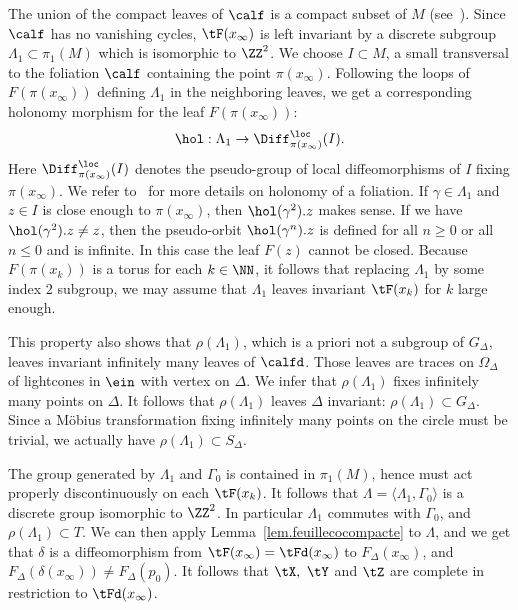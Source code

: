 The union of the compact leaves of $\calf$ is a compact subset of $M$ (see~\cite[Chapter~II, Corollary~3.10]{godbillon}). Since $\calf$ has no vanishing cycles, $\tF(x_{\infty})$ is left invariant by a discrete subgroup $\Lambda_1 \subset \pi_1(M)$ which is isomorphic to $\ZZ^2$. We choose $I \subset M$, a small transversal to the foliation $\calf$ containing the point $\pi(x_{\infty})$. Following the loops of $F(\pi(x_{\infty}))$ defining $\Lambda_1$ in the neighboring leaves, we get a corresponding holonomy morphism for the leaf $F(\pi(x_{\infty}))$:
\[
\hol: \Lambda_1 \to \Diff_{\pi(x_{\infty})}^{\loc}(I).
\]
Here $\Diff_{\pi(x_{\infty})}^{\loc}(I)$ denotes the pseudo-group of local diffeomorphisms of $I$ fixing $\pi(x_{\infty})$. We refer to~\cite[Chapter~II]{godbillon} for more details on holonomy of a foliation. If $\gamma \in \Lambda_1$ and $z \in I$ is close enough to $\pi(x_{\infty})$, then ${\hol}(\gamma^2).z$ makes sense. If we have ${\hol}(\gamma^2).z \not = z$, then the pseudo-orbit ${\hol}(\gamma^n).z$ is defined for all $n \geq 0$ or all $n \leq 0$ and is infinite. In this case the leaf $F(z)$ cannot be closed. Because $F(\pi(x_k))$ is a torus for each $k \in \NN$, it follows that replacing $\Lambda_1$ by some index $2$ subgroup, we may assume that $\Lambda_1$ leaves invariant $\tF(x_k)$ for $k$ large enough.

This property also shows that $\rho(\Lambda_1)$, which is a priori not a subgroup of $G_{\Delta}$, leaves invariant infinitely many leaves of $\calfd$. Those leaves are traces on $\Omega_{\Delta}$ of lightcones in $\ein$ with vertex on $\Delta$. We infer that $\rho(\Lambda_1)$ fixes infinitely many points on $\Delta$. It follows that $\rho(\Lambda_1)$ leaves $\Delta$ invariant: $\rho(\Lambda_1) \subset G_{\Delta}$. Since a Möbius transformation fixing infinitely many points on the circle must be trivial, we actually have $\rho(\Lambda_1) \subset S_{\Delta}$.

The group generated by $\Lambda_1$ and $\Gamma_0$ is contained in $\pi_1(M)$, hence must act properly discontinuously on each $\tF(x_k)$. It follows that $\Lambda=\langle\Lambda_1,\Gamma_0\rangle$ is a discrete group isomorphic to $\ZZ^2$. In particular $\Lambda_1$ commutes with $\Gamma_0$, and $\rho(\Lambda_1) \subset T$. We can then apply Lemma~\ref{lem.feuillecocompacte} to $\Lambda$, and we get that $\delta$ is a diffeomorphism from $\tF(x_{\infty})=\tFd(x_{\infty})$ to $F_{\Delta}(x_{\infty})$, and $F_{\Delta}(\delta(x_{\infty})) \not = F_{\Delta}(p_0)$. It follows that $\tX,\ \tY$ and $\tZ$ are complete in restriction to $\tFd(x_{\infty})$.


